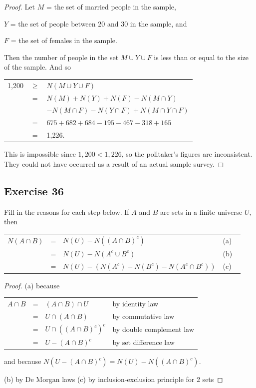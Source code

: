 \documentclass[14pt]{extarticle}
\newcommand{\fbl}{\underline{\hspace{1cm}}\,\,}
\newcommand{\cy}{\color{cyan}}
\begin{document}
\begin{proof}
Let \(M\) = the set of married people in the sample,

\(Y\) = the set of people between 20 and 30 in the sample, and

\(F\) = the set of females in the sample.

Then the number of people in the set \(M \cup Y \cup F\) is less than or equal to the size of the sample. And so 

\begin{tabular}{rcl}
1,200 & \(\geq\) & \(N(M \cup Y \cup F)\) \\
& = & \(N(M) + N(Y) + N(F) - N(M \cap Y)\) \\
&   & \(-N(M \cap F) -N(Y \cap F) + N(M \cap Y \cap F)\) \\ 
& = & \(675 + 682 + 684 - 195 - 467 - 318 + 165\) \\
& = & 1,226.
\end{tabular}

This is impossible since \(1,200 < 1,226\), so the polltaker’s figures are inconsistent. They could not have 
occurred as a result of an actual sample survey.
\end{proof}

\subsection{Exercise 36}
Fill in the reasons for each step below. If $A$ and $B$ are sets in a finite universe $U$, then
\begin{center}
\begin{tabular}{rcll}
\(N(A \cap B)\) & = & \(N(U) - N((A \cap B)^c)\) & {\cy (a) \fbl} \\
& = & \(N(U) - N(A^c \cup B^c)\) & {\cy (b) \fbl} \\
& = & \(N(U) - (N(A^c) + N(B^c) - N(A^c \cap B^c))\) & {\cy (c) \fbl}
\end{tabular}
\end{center}
\begin{proof}
(a) because 
\begin{center}
\begin{tabular}{rcll}
\(A \cap B\) & = & \((A \cap B) \cap U\) & by identity law \\
& = & \(U \cap (A \cap B)\) & by commutative law \\
& = & \(U \cap ((A \cap B)^c)^c\) & by double complement law \\
& = & \(U - (A \cap B)^c\) & by set difference law \\
\end{tabular}
\end{center}
and because \(N(U - (A \cap B)^c) = N(U) - N((A \cap B)^c)\).

(b) by De Morgan laws (c) by inclusion-exclusion principle for 2 sets
\end{proof}
\end{document}
